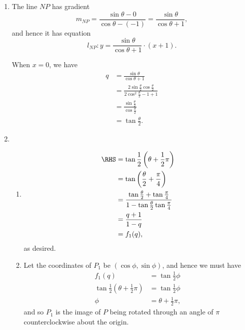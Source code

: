 \Question{\currfilebase}

\begin{enumerate}
    \item The line \(NP\) has gradient
          \[
              m_{NP} = \frac{\sin \theta - 0}{\cos \theta - (-1)} = \frac{\sin \theta}{\cos \theta + 1},
          \]
          and hence it has equation
          \[
              l_{NP}: y = \frac{\sin \theta}{\cos \theta + 1} \cdot (x + 1).
          \]

          When \(x = 0\), we have
          \begin{align*}
              q & = \frac{\sin \theta}{\cos \theta + 1}                                                     \\
                & = \frac{2 \sin \frac{\theta}{2} \cos \frac{\theta}{2}}{2 \cos^2 \frac{\theta}{2} - 1 + 1} \\
                & = \frac{\sin \frac{\theta}{2}}{\cos \frac{\theta}{2}}                                     \\
                & = \tan \frac{\theta}{2}.
          \end{align*}

    \item \begin{enumerate}
              \item \begin{align*}
                        \RHS & = \tan \frac{1}{2} \left(\theta + \frac{1}{2} \pi\right)                                          \\
                             & = \tan \left(\frac{\theta}{2} + \frac{\pi}{4}\right)                                              \\
                             & = \frac{\tan \frac{\theta}{2} + \tan \frac{\pi}{4}}{1 - \tan \frac{\theta}{2} \tan \frac{\pi}{4}} \\
                             & = \frac{q + 1}{1 - q}                                                                             \\
                             & = f_1(q),
                    \end{align*}
                    as desired.

              \item Let the coordinates of \(P_1\) be \((\cos \phi, \sin \phi)\), and hence we must have
                    \begin{align*}
                        f_1(q)                                                & = \tan \frac{1}{2} \phi    \\
                        \tan \frac{1}{2} \left(\theta + \frac{1}{2}\pi\right) & = \tan \frac{1}{2} \phi    \\
                        \phi                                                  & = \theta + \frac{1}{2}\pi,
                    \end{align*}
                    and so \(P_1\) is the image of \(P\) being rotated through an angle of \(\pi\) counterclockwise about the origin.
          \end{enumerate}


\end{enumerate}
